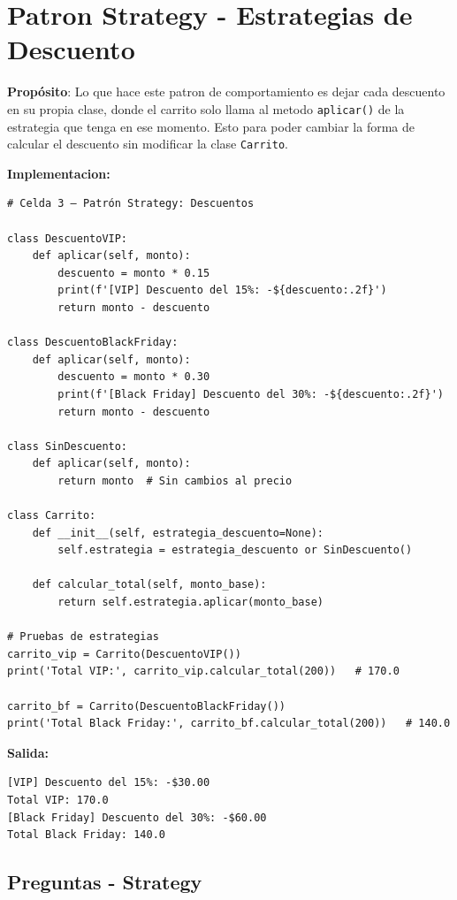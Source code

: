 \documentclass[letterpaper,11pt]{article}
\begin{document}
\section{\textbf{Patron Strategy - Estrategias de Descuento}}

\textbf{Propósito}: Lo que hace este patron de comportamiento es dejar cada descuento en su propia clase, donde el carrito solo llama al metodo \texttt{aplicar()} de la estrategia que tenga en ese momento. Esto para poder cambiar la forma de calcular el descuento sin modificar la clase \texttt{Carrito}.

\textbf{Implementacion:}

\begin{lstlisting}[style=pythonreport]
# Celda 3 – Patrón Strategy: Descuentos

class DescuentoVIP:
    def aplicar(self, monto):
        descuento = monto * 0.15
        print(f'[VIP] Descuento del 15%: -${descuento:.2f}')
        return monto - descuento

class DescuentoBlackFriday:
    def aplicar(self, monto):
        descuento = monto * 0.30
        print(f'[Black Friday] Descuento del 30%: -${descuento:.2f}')
        return monto - descuento

class SinDescuento:
    def aplicar(self, monto):
        return monto  # Sin cambios al precio

class Carrito:
    def __init__(self, estrategia_descuento=None):
        self.estrategia = estrategia_descuento or SinDescuento()

    def calcular_total(self, monto_base):
        return self.estrategia.aplicar(monto_base)

# Pruebas de estrategias
carrito_vip = Carrito(DescuentoVIP())
print('Total VIP:', carrito_vip.calcular_total(200))   # 170.0

carrito_bf = Carrito(DescuentoBlackFriday())
print('Total Black Friday:', carrito_bf.calcular_total(200))   # 140.0
\end{lstlisting}
\par\noindent\textbf{Salida:}
\begin{lstlisting}[style=reportoutput,language={}]
[VIP] Descuento del 15%: -$30.00
Total VIP: 170.0
[Black Friday] Descuento del 30%: -$60.00
Total Black Friday: 140.0
\end{lstlisting}

\subsection*{Preguntas - Strategy}
\end{document}
